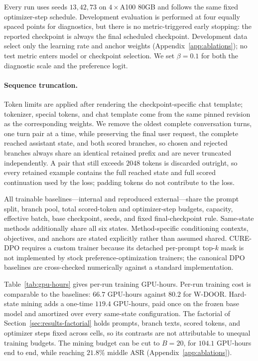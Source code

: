 \documentclass[11pt]{article}
\newcommand{\method}{CURE-DPO}
\newcommand{\asr}{ASR}
\begin{document}
Every run uses seeds \(13,42,73\) on \(4\times\)A100 80GB and follows the same
fixed optimizer-step schedule. Development evaluation is performed at four
equally spaced points for diagnostics, but there is no metric-triggered early
stopping: the reported checkpoint is always the final scheduled checkpoint.
Development data select only the learning rate and anchor weights
(Appendix~\ref{app:ablations}); no test metric enters model or checkpoint
selection. We set \(\beta=0.1\) for both the diagnostic scale and the preference
logit.

\paragraph{Sequence truncation.}
Token limits are applied after rendering the checkpoint-specific chat
template; tokenizer, special tokens, and chat template come from the same
pinned revision as the corresponding weights. We remove the oldest complete
conversation turns, one turn pair at a time, while preserving the final user
request, the complete reached assistant state, and both scored branches, so
chosen and rejected branches always share an identical retained prefix and are
never truncated independently. A pair that still exceeds \(2048\) tokens is
discarded outright, so every retained example contains the full reached state
and full scored continuation used by the loss; padding tokens do not contribute
to the loss.

All trainable baselines---internal and reproduced external---share the prompt
split, branch pool, total scored-token and optimizer-step budgets, capacity,
effective batch, base checkpoint, seeds, and fixed final-checkpoint rule.
Same-state methods additionally share all six states. Method-specific
conditioning contexts, objectives, and anchors are stated explicitly rather
than assumed shared. \method{} requires a custom trainer because its detached
per-prompt top-\(k\) mask is not implemented by stock preference-optimization
trainers; the canonical DPO baselines are cross-checked numerically against a
standard implementation.

Table~\ref{tab:gpu-hours} gives per-run training GPU-hours. Per-run training cost
is comparable to the baselines: \(66.7\) GPU-hours against \(80.2\) for W-DOOR.
Hard-state mining adds a one-time \(119.4\) GPU-hours, paid once on the frozen
base model and amortized over every same-state configuration. The factorial of
Section~\ref{sec:results-factorial} holds prompts, branch texts, scored tokens,
and optimizer steps fixed across cells, so its contrasts are not attributable
to unequal training budgets. The
mining budget can be cut to \(B{=}20\), for \(104.1\) GPU-hours end to end,
while reaching \(21.8\)\% middle \asr{}
(Appendix~\ref{app:ablations}).
\end{document}
